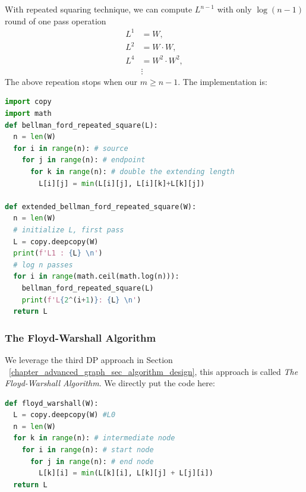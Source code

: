\documentclass[../main.tex]{subfiles}
\begin{document}
With repeated squaring technique, we can compute $L^{n-1}$ with only $\log (n-1)$ round of one pass operation
\begin{align}
    L^{1} &= W,\\\nonumber
    L^{2 }&= W \cdot W, \\\nonumber
    L^{4 }&= W^2 \cdot W^2, \\\nonumber
     &\vdots\nonumber
\end{align}
The above repeation stops when our $m \geq n-1$. The implementation is:
\begin{lstlisting}[language=Python]
import copy
import math
def bellman_ford_repeated_square(L):
  n = len(W)
  for i in range(n): # source
    for j in range(n): # endpoint
      for k in range(n): # double the extending length
        L[i][j] = min(L[i][j], L[i][k]+L[k][j])
  
def extended_bellman_ford_repeated_square(W):
  n = len(W)
  # initialize L, first pass
  L = copy.deepcopy(W)
  print(f'L1 : {L} \n')
  # log n passes
  for i in range(math.ceil(math.log(n))):
    bellman_ford_repeated_square(L)
    print(f'L{2^(i+1)}: {L} \n')
  return L
\end{lstlisting}

\subsubsection{The Floyd-Warshall Algorithm}
We leverage the third DP approach in Section ~\ref{chapter_advanced_graph_sec_algorithm_design}, this approach is called \textit{The Floyd-Warshall Algorithm}. We directly put the code here:
\begin{lstlisting}[language=Python]
def floyd_warshall(W):
  L = copy.deepcopy(W) #L0
  n = len(W)
  for k in range(n): # intermediate node
    for i in range(n): # start node
      for j in range(n): # end node
        L[k][i] = min(L[k][i], L[k][j] + L[j][i])
  return L
\end{lstlisting}
\end{document}
